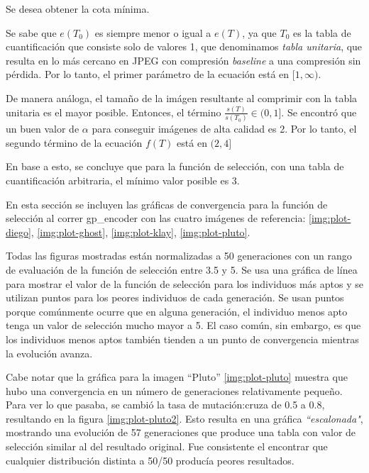 Se desea obtener la cota mínima.

Se sabe que $e(T_0)$ es siempre menor o igual a $e(T)$, ya que $T_0$ es la
tabla de cuantificación que consiste solo de valores 1, que denominamos
\emph{tabla unitaria}, que resulta en lo más cercano en JPEG con compresión
\emph{baseline} a una compresión sin pérdida. Por lo tanto, el primer parámetro
de la ecuación está en $[1, \infty)$.

De manera análoga, el tamaño de la imágen resultante al comprimir con la tabla
unitaria es el mayor posible. Entonces, el término $\frac{s(T)}{s(T_0)} \in (0,
1]$. Se encontró que un buen valor de $\alpha$ para conseguir imágenes de alta
calidad es 2. Por lo tanto, el segundo término de la ecuación $f(T)$ está en
$(2, 4]$

En base a esto, se concluye que para la función de selección, con una tabla de
cuantificación arbitraria, el mínimo valor posible es 3.

En esta sección se incluyen las gráficas de convergencia para la función de
selección al correr gp\_encoder con las cuatro imágenes de referencia:
\ref{img:plot-diego}, \ref{img:plot-ghost}, \ref{img:plot-klay}, \ref{img:plot-pluto}.

Todas las figuras mostradas están normalizadas a 50 generaciones con un rango
de evaluación de la función de selección entre 3.5 y 5. Se usa una gráfica de
línea para mostrar el valor de la función de selección para los individuos más
aptos y se utilizan puntos para los peores individuos de cada generación. Se
usan puntos porque comúnmente ocurre que en alguna generación, el individuo
menos apto tenga un valor de selección mucho mayor a 5. El caso común, sin
embargo, es que los individuos menos aptos también tienden a un punto de
convergencia mientras la evolución avanza.

Cabe notar que la gráfica para la imagen ``Pluto'' \ref{img:plot-pluto} muestra
que hubo una convergencia en un número de generaciones relativamente pequeño.
Para ver lo que pasaba, se cambió la tasa de mutación:cruza de 0.5 a 0.8,
resultando en la figura \ref{img:plot-pluto2}. Esto resulta en una gráfica
\emph{``escalonada"}, mostrando una evolución de 57 generaciones que produce
una tabla con valor de selección similar al del resultado original. Fue
consistente el encontrar que cualquier distribución distinta a 50/50 producía
peores resultados.

